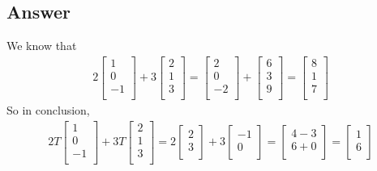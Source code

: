\documentclass[a4paper,12pt]{article}
\begin{document}
\subsection*{Answer}
We know that
\begin{align*}
    2\begin{bmatrix}
        1 \\
        0 \\
        -1 \\
    \end{bmatrix}  + 3\begin{bmatrix}
        2 \\
        1 \\
        3\\
    \end{bmatrix} = \begin{bmatrix}
        2 \\ 
        0 \\
        -2\\
    \end{bmatrix} + \begin{bmatrix}
        6 \\
        3 \\
        9 \\
    \end{bmatrix} = \begin{bmatrix}
        8 \\
        1 \\
        7 \\
    \end{bmatrix}
\end{align*}
So in conclusion,
\begin{align*}
    2T\begin{bmatrix}
        1 \\
        0 \\
        -1 \\
    \end{bmatrix} +
    3T\begin{bmatrix}
        2 \\
        1 \\
        3 \\
    \end{bmatrix} = 2\begin{bmatrix}
        2 \\
        3 \\
    \end{bmatrix} + 
    3\begin{bmatrix}
        -1 \\
        0 \\
    \end{bmatrix} = \begin{bmatrix}
        4 - 3    \\
        6 + 0 \\
    \end{bmatrix} =
    \begin{bmatrix}
        1    \\
        6  \\
    \end{bmatrix}
\end{align*}
\end{document}
